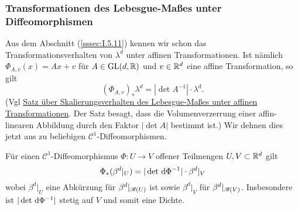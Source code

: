 \subsubsection{Transformationen des Lebesgue-Maßes unter Diffeomorphismen}
Aus dem Abschnitt (\ref{sssec:I.5.11}) kennen wir schon das Transformationsverhalten von $\lambda^d$ unter affinen Transformationen. Ist nämlich $\Phi_{A,v}(x)=Ax+v$ für $A\in\operatorname{GL}(d,\mathbb{R})$ und $v\in \mathbb{R}^d$ eine affine Transformation, so gilt
$$(\Phi_{A,v})_*\lambda^d = |\det A^{-1}|\cdot \lambda^d.$$
(Vgl \hyperref[skalierung-leb]{Satz über Skalierungsverhalten des Lebesgue-Maßes unter affinen Transformationen}. Der Satz besagt, dass die Volumenverzerrung einer affin-linearen Abbildung durch den Faktor $|\det A|$ bestimmt ist.) Wir dehnen dies jetzt aus zu beliebigen $\mathcal{C}^1$-Diffeomorphismen.
\begin{satz}
\begin{mdframed}
Für einen $\mathcal{C}^1$-Diffeomorphismus  $\Phi:U\to V$ offener Teilmengen $U,V\subset \mathbb{R}^d$ gilt
\begin{equation}\label{transform-diffeo}
\Phi_*(\beta^d|_U) = |\det \, \mathrm{d} \Phi^{-1}|\cdot \beta^d|_V
\end{equation}
wobei $\beta^d|_U$ eine Abkürzung für $\beta^d|_{\mathscr{B}(U)}$ ist sowie $\beta^d|_V$ für $\beta^d|_{\mathscr{B}(V)}$. Insbesondere ist $|\det \, \mathrm{d} \Phi^{-1}|$ stetig auf $V$ und somit eine Dichte.
\end{mdframed}


\end{satz}
